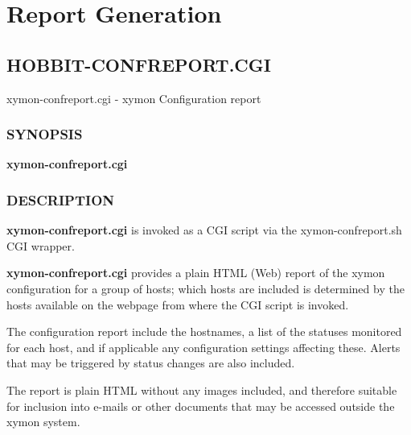 %
\chapter{Report Generation}
%
\newpage
\section{HOBBIT-CONFREPORT.CGI}
 xymon-confreport.cgi - xymon Configuration report

 \subsection{SYNOPSIS}
\textbf{xymon-confreport.cgi}

 
\subsection{DESCRIPTION}
\textbf{xymon-confreport.cgi}
 is invoked as a CGI script via the xymon-confreport.sh CGI wrapper. 

 \textbf{xymon-confreport.cgi}
 provides a plain HTML (Web) report of the xymon configuration for a
 group of hosts; which hosts are included is determined by the hosts
 available on the webpage from where the CGI script is invoked. 



  The configuration report include the hostnames, a list of the
  statuses monitored for each host, and if applicable any
  configuration settings affecting these. Alerts that may be triggered
  by status changes are also included. 



  The report is plain HTML without any images included, and therefore
  suitable for inclusion into e-mails or other documents that may be
  accessed outside the xymon system. 



 
